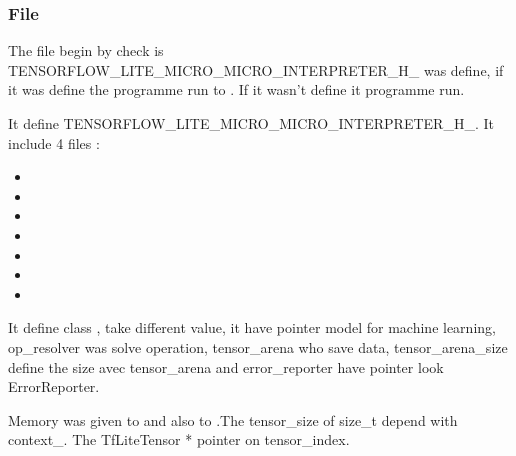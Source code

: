 \subsubsection{File }

The file begin by check is TENSORFLOW\_LITE\_MICRO\_MICRO\_INTERPRETER\_H\_ was define, if it was define the programme run to . If it wasn't define it programme run. 

It define TENSORFLOW\_LITE\_MICRO\_MICRO\_INTERPRETER\_H\_. 
It include 4 files : 

\begin{itemize}
    \item {}
    \item {}
    \item {}
    \item {}
    \item {}
    \item {}
    \item {}
\end{itemize}

\begin{center}
    \label{Figure:MicroErrorRep}
\end{center}


It define class ,  take different value, it have pointer  model for machine learning, op\_resolver was solve operation, tensor\_arena who save data, tensor\_arena\_size define the size avec tensor\_arena and error\_reporter have pointer look ErrorReporter. 


\begin{center}
    \label{Figure:MicroErrorRep}
\end{center}

Memory was given to  and also to .The tensor\_size of size\_t depend with context\_. The TfLiteTensor * pointer on tensor\_index. 


